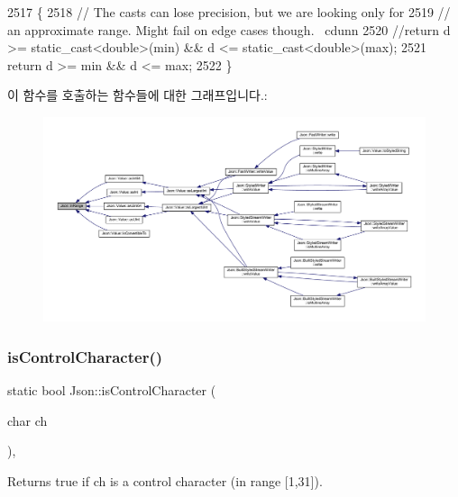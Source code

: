 \begin{DoxyCode}
2517                                                    \{
2518   \textcolor{comment}{// The casts can lose precision, but we are looking only for}
2519   \textcolor{comment}{// an approximate range. Might fail on edge cases though. ~cdunn}
2520   \textcolor{comment}{//return d >= static\_cast<double>(min) && d <= static\_cast<double>(max);}
2521   \textcolor{keywordflow}{return} d >= min && d <= max;
2522 \}
\end{DoxyCode}
이 함수를 호출하는 함수들에 대한 그래프입니다.\+:\nopagebreak
\begin{figure}[H]
\begin{center}
\leavevmode
\includegraphics[width=350pt]{namespace_json_aff0180507262a244de61b961178d7443_icgraph}
\end{center}
\end{figure}
\mbox{\label{namespace_json_a0381e631737f51331065a388f4f59197}} 
\subsubsection{\texorpdfstring{is\+Control\+Character()}{isControlCharacter()}}
{\footnotesize\ttfamily static bool Json\+::is\+Control\+Character (\begin{DoxyParamCaption}\item[{char}]{ch }\end{DoxyParamCaption})\hspace{0.3cm}{\ttfamily [inline]}, {\ttfamily [static]}}



Returns true if ch is a control character (in range \mbox{[}1,31\mbox{]}). 




